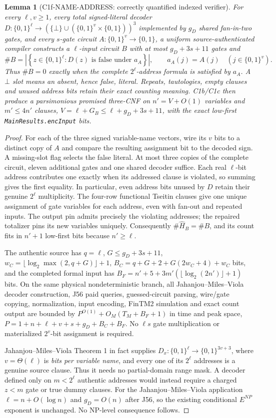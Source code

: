 \documentclass[11pt]{article}
\newtheorem{lemma}{Lemma}
\begin{document}
\begin{lemma}[C1f-NAME-ADDRESS: correctly quantified indexed verifier]
For every $\ell,v\ge1$, every total signed-literal decoder
$D:\{0,1\}^{\ell}\to
 (\{\bot\}\cup(\{0,1\}^{v}\times\{0,1\}))^3$
implemented by $g_D$ shared fan-in-two gates, and every
$s$-gate circuit $A:\{0,1\}^{v}\to\{0,1\}$, a uniform
source-authenticated compiler constructs a $\ell$-input
circuit $B$ with at most $g_D+3s+11$ gates and
\[
\#B=\left|\left\{z\in\{0,1\}^{\ell}:
          D(z)\text{ is false under }a_A\right\}\right|,
\qquad
a_A(j)=A(j)\quad(j\in\{0,1\}^{v}).
\]
Thus $\#B=0$ exactly when the \emph{complete}
$2^\ell$-address formula is satisfied by $a_A$.
A $\bot$ slot means an absent, hence false, literal.
Repeats, tautologies, empty clauses and unused address bits
retain their exact counting meaning. C1b/C1c then produce
a parsimonious promised three-CNF on
$n'=V+O(1)$ variables and $m'\le4n'$ clauses,
$V=\ell+G_B\le\ell+g_D+3s+11$, with
the exact low-first \texttt{MainResults.encInput} bits.
\end{lemma}
\begin{proof}
For each of the three signed variable-name vectors,
wire its $v$ bits to a distinct copy of $A$ and compare
the resulting assignment bit to the decoded sign.
A missing-slot flag selects the false literal.
At most three copies of the complete circuit, eleven
additional gates and one shared decoder suffice.
Each real $\ell$-bit address contributes one exactly
when its addressed clause is violated, so summing gives
the first equality. In particular, even address bits
unused by $D$ retain their genuine $2^\ell$ multiplicity.
The four-row functional Tseitin clauses give one unique
assignment of gate variables for each address, even
with fan-out and repeated inputs. The output pin admits
precisely the violating addresses; the repaired
totalizer pins its new variables uniquely. Consequently
$\#\widehat H_B=\#B$, and its count fits in $n'+1$
low-first bits because $n'\ge\ell$.

The authentic source has $q=\ell$, $G\le g_D+3s+11$,
$w_C=\lfloor\log_2\max(2,q+G)\rfloor+1$,
$B_C=q+G+2+G(2w_C+4)+w_C$ bits, and
the completed formal input has
$B_F=n'+5+3m'(\lfloor\log_2(2n')\rfloor+1)$ bits.
On the same physical nondeterministic branch, all
Jahanjou--Miles--Viola decoder construction, J56
paid queries, guessed-circuit parsing, wire/gate
copying, normalization, input encoding, FinTM2
simulation and exact count output are bounded by
$P^{O(1)}+O_M(T_M+B_F+1)$ in time and peak space,
$P=1+n+\ell+v+s+g_D+B_C+B_F$.
No $\ell s$ gate multiplication or materialized
$2^v$-bit assignment is required.

Jahanjou--Miles--Viola Theorem 1 in fact supplies
$D_x:\{0,1\}^{\ell}\to\{0,1\}^{3v+3}$,
where $v=\Theta(\ell)$ is \emph{bits per variable
name}, and every one of its $2^\ell$ addresses
is a genuine source clause. Thus it needs no
partial-domain range mask. A decoder defined only
on $m<2^\ell$ authentic addresses would instead
require a charged $z<m$ gate or true dummy clauses.
For the Jahanjou--Miles--Viola application
$\ell=n+O(\log n)$ and $g_D=O(n)$ after J56,
so the existing conditional $E^{NP}$ exponent
is unchanged. No NP-level consequence follows.
\end{proof}
\end{document}
